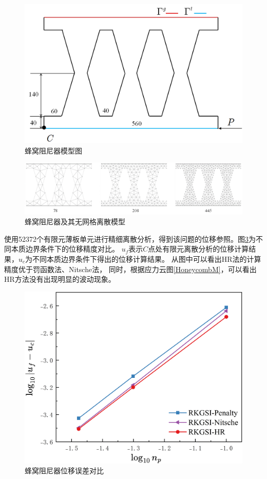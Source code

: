 \begin{figure}[H]
    \centering
    \includegraphics[scale=0.5]{figure/DAMPER/Honeycomb/2.png}
    \caption{蜂窝阻尼器模型图}\label{Honeycomb2}
\end{figure}
\begin{figure}[H]
    \centering
    \includegraphics[scale=0.6]{figure/DAMPER/Honeycomb/honeycomb_damper_msh.png}
    \caption{蜂窝阻尼器及其无网格离散模型}\label{Honeycombmsh}
\end{figure}
使用52372个有限元薄板单元进行精细离散分析，得到该问题的位移参照。图\ref{honeycomb_damperx}为不同本质边界条件下的位移精度对比。
$u_f$表示$C$点处有限元离散分析的位移计算结果，$u_c$为不同本质边界条件下得出的位移计算结果。
从图中可以看出HR法的计算精度优于罚函数法、Nitsche法，
同时，根据应力云图\ref{HoneycombM}，可以看出HR方法没有出现明显的波动现象。
\newpage
\begin{figure}[H]
    \centering
    \includegraphics[scale=0.5]{figure/DAMPER/Honeycomb/honeycomb_damper_x.png}
    \caption{蜂窝阻尼器位移误差对比}\label{honeycomb_damperx}
\end{figure}
